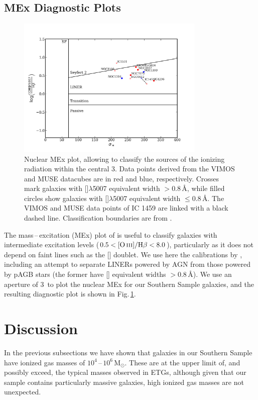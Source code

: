 		


	\subsection{MEx Diagnostic Plots}
		\label{subsec:MEx}
		\begin{figure}
			\centering
			\includegraphics[width=0.8\textwidth]{chapter5/nuclear_MEx.png}
			\caption[Nuclear mass\,--\,excitation plot]{Nuclear MEx plot, allowing to classify the sources of the ionizing radiation within the central 3\arcsec. Data points derived from the VIMOS and MUSE datacubes are in red and blue, respectively. Crosses mark galaxies with []$\lambda$5007 equivalent width $> 0.8$\,\AA, while filled circles show galaxies with []$\lambda$5007 equivalent width $\leqslant 0.8$\,\AA. The VIMOS and MUSE data points of IC 1459 are linked with a black dashed line. Classification boundaries are from \citet{Nyland2016}.}
			\label{fig:MEx}
		\end{figure}

		The mass\,--\,excitation (MEx) plot of \citet{Juneau2011} is useful to classify galaxies with intermediate excitation levels ($0.5 < \mathrm{[\ion{O}{iii}]/H\beta} < 8.0$), particularly as it does not depend on faint lines such as the [] doublet. We use here the calibrations by \citet{Nyland2016}, including an attempt to separate LINERs powered by AGN from those powered by pAGB stars (the former have [] equivalent widths $>0.8$\,\AA). We use an aperture of 3\arcsec\ to plot the nuclear MEx for our Southern Sample galaxies, and the resulting diagnostic plot is shown in Fig.\,\ref{fig:MEx}. 



\section{Discussion}
	\label{sec:gasDiscussion}
	In the previous subsections we have shown that galaxies in our Southern Sample have ionized gas masses of $10^4$\,--\,$10^6\,\mathrm{M_\odot}$. These are at the upper limit of, and possibly exceed, the typical masses observed in ETGs, although given that our sample contains particularly massive galaxies, high ionized gas masses are not unexpected. 

